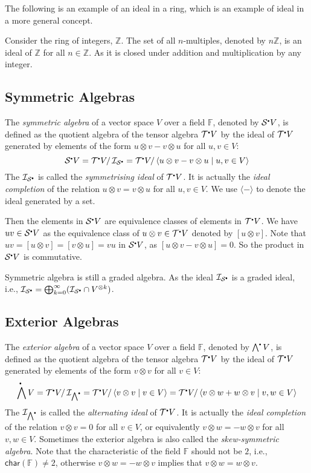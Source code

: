 \documentclass[
	11pt, %
	fleqn, %
	a4paper, %
]{LegrandOrangeBook}
\newcommand{\smallbullet}{\scalebox{0.5}{$\bullet$}}
\newcommand{\quotient}[2]{#1/\, #2} %
\newcommand{\F}{\mathbb{F}} %
\newcommand{\T}{\mathcal{T}^{\smallbullet}} %
\newcommand{\chart}{\mathsf{char}} %
\newcommand{\Sym}{\mathcal{S}^{\smallbullet}} %
\newcommand{\Ext}{\bigwedge^{\smallbullet}} %
\newcommand{\ideal}{\mathcal{I}} %
\begin{document}
The following is an example of an ideal in a ring, which is an example of ideal in a more general concept.
\begin{example}
    Consider the ring of integers, $\mathbb{Z}$. The set of all $n$-multiples, denoted by $n\mathbb{Z}$, is an ideal of $\mathbb{Z}$ for all $n \in \mathbb{Z}$. As it is closed under addition and multiplication by any integer.
\end{example}

\subsection{Symmetric Algebras}

The \emph{symmetric algebra} of a vector space $V$ over a field $\F$, denoted by $\Sym V$, is defined as the quotient algebra of the tensor algebra $\T V$ by the ideal of $\T V$ generated by elements of the form $u \otimes v - v \otimes u$ for all $u, v \in V$:
\[
    \Sym V = \quotient{\T V}{\ideal_{\Sym}} = \quotient{\T V}{\langle u \otimes v - v \otimes u \mid u, v \in V \rangle}
\]
The $\ideal_{\Sym}$ is called the \emph{symmetrising ideal} of $\T V$. It is actually the \emph{ideal completion} of the relation $u \otimes v = v \otimes u$ for all $u, v \in V$. We use $\langle - \rangle$ to denote the ideal generated by a set.

Then the elements in $\Sym V$ are equivalence classes of elements in $\T V$. We have $uv \in \Sym V$ as the equivalence class of $u \otimes v \in \T V$ denoted by $[u \otimes v]$. Note that $uv = [u \otimes v] = [v \otimes u] = vu$ in $\Sym V$, as $[u \otimes v - v \otimes u] = 0$. So the product in $\Sym V$ is commutative. 

\begin{remark}
    Symmetric algebra is still a graded algebra. As the ideal $\ideal_{\Sym}$ is a graded ideal, i.e., $\ideal_{\Sym} = \bigoplus_{k = 0}^{\infty} (\ideal_{\Sym} \cap V^{\otimes k})$.
\end{remark}

\subsection{Exterior Algebras}

The \emph{exterior algebra} of a vector space $V$ over a field $\F$, denoted by $\Ext V$, is defined as the quotient algebra of the tensor algebra $\T V$ by the ideal of $\T V$ generated by elements of the form $v \otimes v$ for all $v \in V$:
\[
    \Ext V = \quotient{\T V}{\ideal_{\Ext}} = \quotient{\T V}{\langle v \otimes v \mid v \in V \rangle} = \quotient{\T V}{\langle v \otimes w + w \otimes v \mid v, w \in V \rangle}
\]
The $\ideal_{\Ext}$ is called the \emph{alternating ideal} of $\T V$. It is actually the \emph{ideal completion} of the relation $v \otimes v = 0$ for all $v \in V$, or equivalently $v \otimes w = - w \otimes v$ for all $v, w \in V$. Sometimes the exterior algebra is also called the \emph{skew-symmetric algebra}. Note that the characteristic of the field $\F$ should not be $2$, i.e., $\chart(\F) \neq 2$, otherwise $v \otimes w = - w \otimes v$ implies that $v \otimes w = w \otimes v$.
\end{document}
